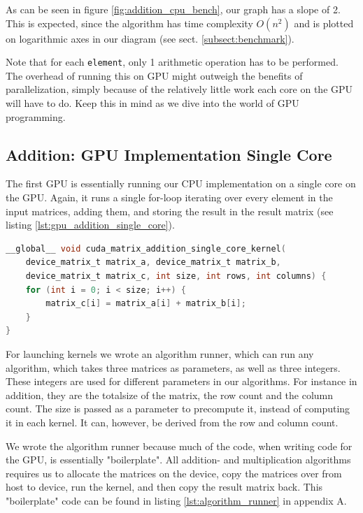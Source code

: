  As can be seen in figure \ref{fig:addition_cpu_bench}, our graph has a slope of 2. This is expected, since the algorithm has time complexity $O(n^2)$ and is plotted on logarithmic axes in our diagram (see sect. \ref{subsect:benchmark}).

Note that for each \texttt{element}, only 1 arithmetic operation has to be performed. The overhead of running this on GPU might outweigh the benefits of parallelization, simply because of the relatively little work each core on the GPU will have to do. Keep this in mind as we dive into the world of GPU programming.

\subsection{Addition: GPU Implementation Single Core}
The first GPU is essentially running our CPU implementation on a single core on the GPU. Again, it runs a single for-loop iterating over every element in the input matrices, adding them, and storing the result in the result matrix (see listing \ref{lst:gpu_addition_single_core}).

\begin{lstlisting}[language=C, caption={GPU addition single core}, label={lst:gpu_addition_single_core}]
__global__ void cuda_matrix_addition_single_core_kernel(
    device_matrix_t matrix_a, device_matrix_t matrix_b,
    device_matrix_t matrix_c, int size, int rows, int columns) {
    for (int i = 0; i < size; i++) {
        matrix_c[i] = matrix_a[i] + matrix_b[i];
    }
}
\end{lstlisting}

For launching kernels we wrote an algorithm runner, which can run any algorithm, which takes three matrices as parameters, as well as three integers. These integers are used for different parameters in our algorithms. For instance in addition, they are the totalsize of the matrix, the row count and the column count. The size is passed as a parameter to precompute it, instead of computing it in each kernel. It can, however, be derived from the row and column count. 

We wrote the algorithm runner because much of the code, when writing code for the GPU, is essentially "boilerplate". All addition- and multiplication algorithms requires us to allocate the matrices on the device, copy the matrices over from host to device, run the kernel, and then copy the result matrix back. This "boilerplate" code can be found in listing \ref{lst:algorithm_runner} in appendix A.

